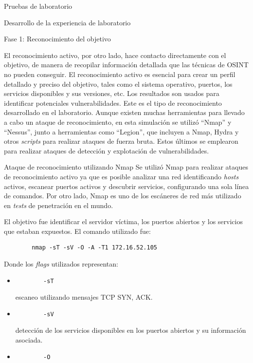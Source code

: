 \begin{section}{Pruebas de laboratorio}
\begin{subsection}{Desarrollo de la experiencia de laboratorio}
\begin{subsubsection}{Fase 1: Reconocimiento del objetivo}
\begin{figure}[H]
    \label{fig:osint}
    \end{figure}
    \FloatBarrier
    El reconocimiento activo, por otro lado, hace contacto directamente con el objetivo, de manera de recopilar información detallada que las técnicas de OSINT no pueden conseguir. El reconocimiento activo es esencial para crear un perfil detallado y preciso del objetivo, tales como el sistema operativo, puertos, los servicios disponibles y sus versiones, etc. Los resultados son usados para identificar potenciales vulnerabilidades. Este es el tipo de reconocimiento desarrollado en el laboratorio. Aunque existen muchas herramientas para llevado a cabo un ataque de reconocimiento, en esta simulación se utilizó “Nmap” y “Nessus”, junto a herramientas como “Legion”, que incluyen a Nmap, Hydra y otros \textit{scripts} para realizar ataques de fuerza bruta. Estos últimos se emplearon para realizar ataques de detección y explotación de vulnerabilidades. 
    \end{subsubsection}
    \begin{subsubsection}{Ataque de reconocimiento utilizando Nmap}
    Se utilizó Nmap \cite{nmap} para realizar ataques de reconocimiento activo ya que es posible analizar una red identificando \textit{hosts} activos, escanear puertos activos y descubrir servicios, configurando una sola línea de comandos. Por otro lado, Nmap es uno de los escáneres de red más utilizado en \textit{tests} de penetración en el mundo.\par
    El objetivo fue identificar el servidor víctima, los puertos abiertos y los servicios que estaban expuestos.
    El comando utilizado fue: 
    \begin{verbatim}
        nmap -sT -sV -O -A -T1 172.16.52.105
    \end{verbatim}
    Donde los \textit{flags} utilizados representan:
    \begin{itemize}
        \item \begin{verbatim}
        -sT    
        \end{verbatim}
         escaneo utilizando mensajes TCP SYN, ACK.
        \item \begin{verbatim}
        -sV
        \end{verbatim}
         detección de los servicios disponibles en los puertos abiertos y su información asociada.
        \item \begin{verbatim}
        -O
        \end{verbatim} 

\end{itemize}
\end{subsubsection}
\end{subsection}
\end{section}
